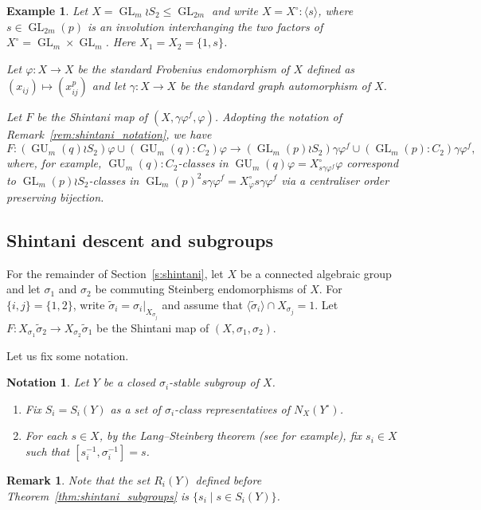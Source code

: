 \documentclass[11pt]{article}
\numberwithin{equation}{section}
\theoremstyle{shdefinition}
\newtheorem{remark}[definition]{Remark}
\newtheorem{example}[definition]{Example}
\newtheorem{notation}[definition]{Notation}
\theoremstyle{shplain}
\newcommand{\g}{\gamma}
\newcommand{\p}{\varphi}
\newcommand{\s}{\sigma}
\newcommand{\ws}{\widetilde{\sigma}}
\newcommand{\<}{\langle}
\renewcommand{\>}{\rangle}
\renewcommand{\leq}{\leqslant}
\renewcommand{\:}{\colon}
\newcommand{\GL}{\operatorname{GL}}
\newcommand{\GU}{\operatorname{GU}}
\begin{document}
\begin{example} \label{ex:shintani}
Let $X = {\GL_m} \wr S_2 \leq \GL_{2m}$ and write $X = X^\circ{:}\<s\>$, where $s \in \GL_{2m}(p)$ is an involution interchanging the two factors of $X^\circ = \GL_m \times \GL_m$. Here $X_1 = X_2 = \{ 1, s \}$.

Let $\p\: X \to X$ be the standard Frobenius endomorphism of $X$ defined as $(x_{ij}) \mapsto (x_{ij}^p)$ and let $\g\: X \to X$ be the standard graph automorphism of $X$.

Let $F$ be the Shintani map of $(X,\g\p^f,\p)$. Adopting the notation of Remark~\ref{rem:shintani_notation}, we have
\[
F\: (\GU_m(q) \wr S_2)\p \cup (\GU_m(q){:}C_2)\p \to (\GL_m(p) \wr S_2)\g\p^f \cup (\GL_m(p){:}C_2)\g\p^f,
\]
where, for example, $\GU_m(q){:}C_2$-classes in $\GU_m(q)\p = X^\circ_{s\g\p^f}\p$ correspond to $\GL_m(p) \wr S_2$-classes in $\GL_m(p)^2 s\g\p^f= X^\circ_{\p}s\g\p^f$ via a centraliser order preserving bijection.
\end{example}


\subsection{Shintani descent and subgroups} \label{ss:shintani_subgroups}

For the remainder of Section~\ref{s:shintani}, let $X$ be a connected algebraic group and let $\s_1$ and $\s_2$ be commuting Steinberg endomorphisms of $X$. For $\{ i,j \} = \{ 1,2 \}$, write $\ws_i = \s_i|_{X_{\s_j}}$ and assume that $\<\ws_i\> \cap X_{\s_j} = 1$. Let $F\:X_{\s_1}\ws_2 \to X_{\s_2}\ws_1$ be the Shintani map of $(X,\s_1,\s_2)$. 

Let us fix some notation.

\begin{notation} \label{not:shintani_subgroups}
Let $Y$ be a closed $\s_i$-stable subgroup of $X$.
\begin{enumerate}
\item Fix $S_i = S_i(Y)$ as a set of $\s_i$-class representatives of $N_X(Y^\circ)$. 
\item For each $s \in X$, by the Lang--Steinberg theorem (see \cite[Theorem~2.1.1]{ref:GorensteinLyonsSolomon98} for example), fix $s_i \in X$ such that $[s_i^{-1},\s_i^{-1}] = s$.
\end{enumerate}
\end{notation}

\begin{remark} \label{rem:shintani_subgroups}
Note that the set $R_i(Y)$ defined before Theorem~\ref{thm:shintani_subgroups} is $\{ s_i \mid s \in S_i(Y) \}$.
\end{remark}
\end{document}
